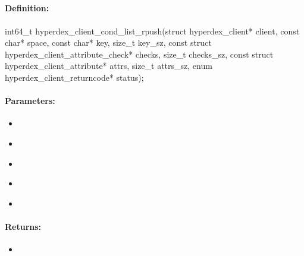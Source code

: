 \pagebreak
\subsection{}
\label{api:c:cond_list_rpush}


\paragraph{Definition:}
\begin{ccode}
int64_t hyperdex_client_cond_list_rpush(struct hyperdex_client* client,
        const char* space,
        const char* key, size_t key_sz,
        const struct hyperdex_client_attribute_check* checks, size_t checks_sz,
        const struct hyperdex_client_attribute* attrs, size_t attrs_sz,
        enum hyperdex_client_returncode* status);
\end{ccode}

\paragraph{Parameters:}
\begin{itemize}[noitemsep]
\item {}\\

\item {}\\

\item {}\\

\item {}\\

\item {}\\

\end{itemize}

\paragraph{Returns:}
\begin{itemize}[noitemsep]
\item {}\\

\end{itemize}

